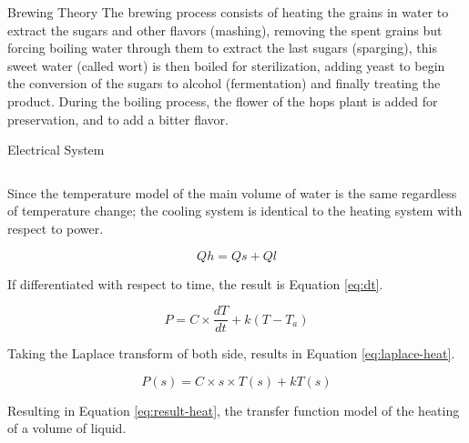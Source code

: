 \documentclass[final]{beamer}
\newlength{\onecolwid}
\newlength{\twocolwid}
\begin{document}
\begin{frame}[t]
\begin{columns}[t]
\begin{column}{\twocolwid}
\begin{alertblock}{Brewing Theory}
The brewing process consists of heating the grains in water to extract the sugars and other flavors (mashing), removing the spent grains but forcing boiling water through them to extract the last sugars (sparging), this sweet water (called wort) is then boiled for sterilization, adding yeast to begin the conversion of the sugars to alcohol (fermentation) and finally treating the product.  During the boiling process, the flower of the hops plant is added for preservation, and to add a bitter flavor.

\end{alertblock} 


\begin{block}{Electrical System}

\begin{columns}[t,totalwidth=\twocolwid] %

\begin{column}{\onecolwid} %
\vspace{-.3in}
\begin{justify}
Since the temperature model of the main volume of water is the same regardless of  temperature change; the cooling system is identical to the heating system with respect to power.

\begin{equation}
Qh = Qs + Ql
\label{eq:heat-system}
\end{equation}

\noindent If differentiated with respect to time, the result is Equation \ref{eq:dt}.

\begin{equation}
P = C \times \frac{dT}{dt} + k(T - T_{a})
\label{eq:dt}
\end{equation}

Taking the Laplace transform of both side, results in Equation \ref{eq:laplace-heat}.

\begin{equation}
P(s) = C \times s \times T(s) + kT(s)
\label{eq:laplace-heat}
\end{equation}

\noindent Resulting in Equation \ref{eq:result-heat}, the transfer function model of the heating of a volume of liquid.


\end{justify}
\end{column}
\end{columns}
\end{block}
\end{column}
\end{columns}
\end{frame}
\end{document}
